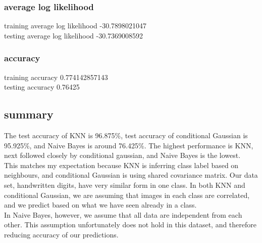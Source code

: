 \documentclass[letterpaper, 12]{article}
\begin{document}
\subsubsection{average log likelihood}
training average log likelihood -30.7898021047\\
testing average log likelihood -30.7369008592
\subsubsection{accuracy}
training accuracy 0.774142857143\\
testing accuracy 0.76425\\

\subsection{summary}
The test accuracy of KNN is 96.875\%, test accuracy of conditional Gaussian is 95.925\%, and Naive Bayes is around 76.425\%. The highest performance is KNN, next followed closely by conditional gaussian, and Naive Bayes is the lowest.\\
This matches my expectation because KNN is inferring class label based on neighbours, and conditional Gaussian is using shared covariance matrix. Our data set, handwritten digits, have very similar form in one class. In both KNN and conditional Gaussian, we are assuming that images in each class are correlated, and we predict based on what we have seen already in a class.\\
In Naive Bayes, however, we assume that all data are independent from each other. This assumption unfortunately does not hold in this dataset, and therefore reducing accuracy of our predictions.




\end{document}

